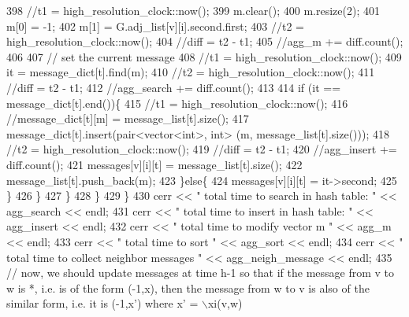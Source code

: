 \begin{DoxyCode}
398 \textcolor{comment}{          //t1 = high\_resolution\_clock::now();}
399 \textcolor{comment}{          m.clear();}
400 \textcolor{comment}{          m.resize(2);}
401 \textcolor{comment}{          m[0] = -1;}
402 \textcolor{comment}{          m[1] = G.adj\_list[v][i].second.first;}
403 \textcolor{comment}{          //t2 = high\_resolution\_clock::now();}
404 \textcolor{comment}{          //diff = t2 - t1;}
405 \textcolor{comment}{          //agg\_m += diff.count();}
406 \textcolor{comment}{}
407 \textcolor{comment}{          // set the current message}
408 \textcolor{comment}{          //t1 = high\_resolution\_clock::now();}
409 \textcolor{comment}{          it = message\_dict[t].find(m);}
410 \textcolor{comment}{          //t2 = high\_resolution\_clock::now();}
411 \textcolor{comment}{          //diff = t2 - t1;}
412 \textcolor{comment}{          //agg\_search += diff.count();}
413 \textcolor{comment}{}
414 \textcolor{comment}{          if (it == message\_dict[t].end())\{}
415 \textcolor{comment}{            //t1 = high\_resolution\_clock::now();}
416 \textcolor{comment}{            //message\_dict[t][m] = message\_list[t].size();}
417 \textcolor{comment}{            message\_dict[t].insert(pair<vector<int>, int> (m, message\_list[t].size()));}
418 \textcolor{comment}{            //t2 = high\_resolution\_clock::now();}
419 \textcolor{comment}{            //diff = t2 - t1;}
420 \textcolor{comment}{            //agg\_insert += diff.count();}
421 \textcolor{comment}{            messages[v][i][t] = message\_list[t].size();}
422 \textcolor{comment}{            message\_list[t].push\_back(m);}
423 \textcolor{comment}{          \}else\{}
424 \textcolor{comment}{            messages[v][i][t] = it->second;}
425 \textcolor{comment}{          \}}
426 \textcolor{comment}{        \}}
427 \textcolor{comment}{      \}}
428 \textcolor{comment}{    \}}
429 \textcolor{comment}{  \}}
430 \textcolor{comment}{  cerr << " total time to search in hash table: " << agg\_search << endl;}
431 \textcolor{comment}{  cerr << " total time to insert in hash table: " << agg\_insert << endl;}
432 \textcolor{comment}{  cerr << " total time to modify vector m  " << agg\_m << endl;}
433 \textcolor{comment}{  cerr << " total time to sort  " << agg\_sort << endl;}
434 \textcolor{comment}{  cerr << " total time to collect neighbor messages " <<  agg\_neigh\_message << endl;}
435 \textcolor{comment}{  // now, we should update messages at time h-1 so that if the message from v to w is *, i.e. is of the
       form (-1,x), then the message from w to v is also of the similar form, i.e. it is (-1,x') where x' = \(\backslash\)xi(v,w)}

\end{DoxyCode}
